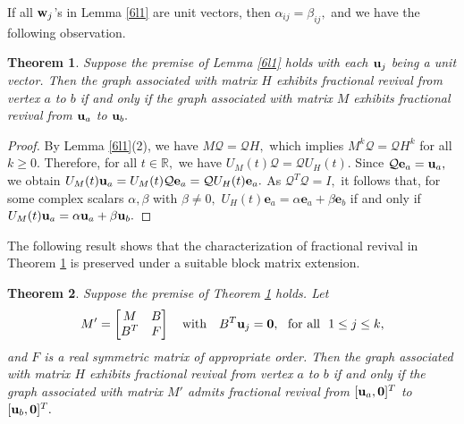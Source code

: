 \documentclass[12pt,a4paper]{article}
\newtheorem{thm}{Theorem}
\def \e {{\bf e}}
\def \u {{\bf u}}
\def \w {{\bf w}}
\def \e {{\mathbf e}}
\begin{document}
If all $\w_j$'s in Lemma \ref{6l1} are unit vectors, then $\alpha_{ij}=\beta_{ij},$ and we have the following observation.

\begin{thm}\label{6t1}
    Suppose the premise of Lemma \ref{6l1} holds with each $\u_j$ being a unit vector. Then the graph associated with matrix $H$ exhibits fractional revival from vertex $a$ to $b$ if and only if the graph associated with matrix $M$ exhibits fractional revival from $\u_a$ to $\u_b.$ 
\end{thm}
\begin{proof}
   By Lemma \ref{6l1}(2), we have  $M\mathcal{Q}=\mathcal{Q}H,$ which implies $M^k\mathcal{Q}=\mathcal{Q}H^k$ for all $k\geq 0.$ Therefore, for all $t\in\mathbb{R},$ we have $U_M(t)\mathcal{Q}=\mathcal{Q}U_H(t).$ Since $\mathcal{Q}\e_a=\u_a,$ we obtain $U_M(t)\u_a=U_M(t)\mathcal{Q}\e_a=\mathcal{Q}U_H(t)\e_a.$ As $\mathcal{Q}^T\mathcal{Q}=I,$ it follows that, for some complex scalars $\alpha, \beta$ with $\beta\neq 0,$ $U_H(t)\e_a=\alpha\e_a+\beta\e_b$ if and only if $U_M(t)\u_a=\alpha\u_a+\beta\u_b.$  
\end{proof}
The following result shows that the characterization of fractional revival in Theorem \ref{6t1} is preserved under a suitable block matrix extension.
\begin{thm}\label{6t4}
    Suppose the premise of Theorem \ref{6t1} holds. Let 
    \[M'=\begin{bmatrix}
        M & B\\
        B^T & F
    \end{bmatrix}\quad\text{with} \quad B^T\u_j=\mathbf{0}, ~~\text{for all}~~1\leq j \leq k,\]
    and $F$ is a real symmetric matrix of appropriate order.
    Then the graph associated with matrix $H$ exhibits fractional revival from vertex $a$ to $b$ if and only if  the graph associated with matrix $M'$ admits fractional revival from $[\u_a,\mathbf{0}]^T$ to $[\u_b,\mathbf{0}]^T.$
\end{thm}
\end{document}
